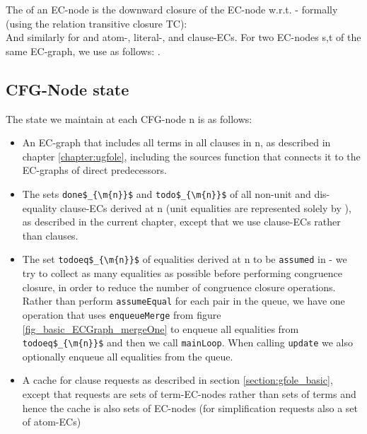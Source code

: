 The  of an EC-node is the downward closure of the EC-node w.r.t. \GFAs{} - formally (using the relation transitive closure TC):\\
And similarly for \GFAs{} and atom-, literal-, and clause-ECs.
For two EC-nodes s,t of the same EC-graph, we use  as follows:
.

\bigskip 

\subsection*{CFG-Node state}
The state we maintain at each CFG-node n is as follows:
\begin{itemize}
	\item An EC-graph  that includes all terms in all clauses in n, as described in chapter \ref{chapter:ugfole}, including the sources function that connects it to the EC-graphs of direct predecessors.
	\item The sets \lstinline|done$_{\m{n}}$| and \lstinline|todo$_{\m{n}}$| of all non-unit and dis-equality clause-ECs derived at n (unit equalities are represented solely by ), as described in the current chapter, except that we use clause-ECs rather than clauses.
	\item The set \lstinline|todoeq$_{\m{n}}$| of equalities derived at n to be \lstinline|assumed| in  - we try to collect as many equalities as possible before performing congruence closure, in order to reduce the number of congruence closure operations. 
	Rather than perform \lstinline|assumeEqual| for each pair in the queue, we have one operation that uses \lstinline|enqueueMerge| from figure \ref{fig_basic_ECGraph_mergeOne} to enqueue all equalities from \lstinline|todoeq$_{\m{n}}$| and then we call \lstinline|mainLoop|.
	When calling \lstinline|update| we also optionally enqueue all equalities from the queue.
	\item A cache for clause requests as described in section \ref{section:gfole_basic}, except that requests are sets of term-EC-nodes rather than sets of terms and hence the cache is also sets of EC-nodes (for simplification requests also a set of atom-ECs)
\end{itemize}


